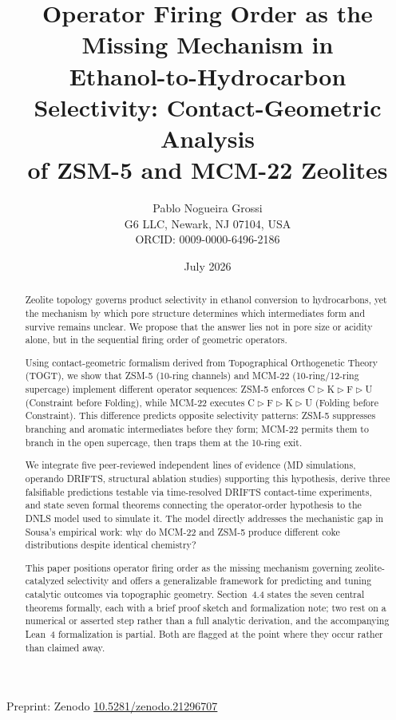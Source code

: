 \documentclass[11pt]{article}
\title{\Large Operator Firing Order as the Missing Mechanism in\\
Ethanol-to-Hydrocarbon Selectivity: Contact-Geometric Analysis\\
of ZSM-5 and MCM-22 Zeolites}
\author{Pablo Nogueira Grossi\\[2pt]\small G6 LLC, Newark, NJ 07104, USA\\[2pt]\small ORCID: 0009-0000-6496-2186}
\date{July 2026}
\newcommand{\comp}{\mathrel{\triangleright}} %
\begin{document}
\maketitle

\begin{center}
\small
Preprint: Zenodo \href{https://doi.org/10.5281/zenodo.21296707}{10.5281/zenodo.21296707}
\end{center}

\begin{abstract}
Zeolite topology governs product selectivity in ethanol conversion to hydrocarbons, yet the mechanism by which pore structure determines which intermediates form and survive remains unclear. We propose that the answer lies not in pore size or acidity alone, but in the sequential firing order of geometric operators.

Using contact-geometric formalism derived from Topographical Orthogenetic Theory (TOGT), we show that ZSM-5 (10-ring channels) and MCM-22 (10-ring/12-ring supercage) implement different operator sequences: ZSM-5 enforces C$\comp$K$\comp$F$\comp$U (Constraint before Folding), while MCM-22 executes C$\comp$F$\comp$K$\comp$U (Folding before Constraint). This difference predicts opposite selectivity patterns: ZSM-5 suppresses branching and aromatic intermediates before they form; MCM-22 permits them to branch in the open supercage, then traps them at the 10-ring exit.

We integrate five peer-reviewed independent lines of evidence (MD simulations, operando DRIFTS, structural ablation studies) supporting this hypothesis, derive three falsifiable predictions testable via time-resolved DRIFTS contact-time experiments, and state seven formal theorems connecting the operator-order hypothesis to the DNLS model used to simulate it. The model directly addresses the mechanistic gap in Sousa's empirical work: why do MCM-22 and ZSM-5 produce different coke distributions despite identical chemistry?

This paper positions operator firing order as the missing mechanism governing zeolite-catalyzed selectivity and offers a generalizable framework for predicting and tuning catalytic outcomes via topographic geometry. Section~4.4 states the seven central theorems formally, each with a brief proof sketch and formalization note; two rest on a numerical or asserted step rather than a full analytic derivation, and the accompanying Lean~4 formalization is partial. Both are flagged at the point where they occur rather than claimed away.
\end{abstract}
\end{document}
